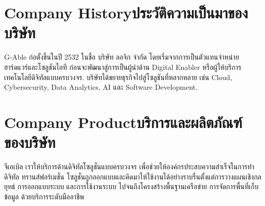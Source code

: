\section{\ifenglish Company History\else ประวัติความเป็นมาของบริษัท\fi}

G-Able ก่อตั้งขึ้นในปี 2532 ในชื่อ บริษัท ลอจิก จำกัด โดยเริ่มจากการเป็นตัวแทนจำหน่ายฮาร์ดแวร์และโซลูชันไอที ก่อนจะพัฒนาสู่การเป็นผู้นำด้าน Digital Enabler หรือผู้ให้บริการเทคโนโลยีดิจิทัลแบบครบวงจร. บริษัทได้ขยายธุรกิจไปสู่โซลูชันที่หลากหลาย เช่น Cloud, Cybersecurity, Data Analytics, AI และ Software Development. 

\section{\ifenglish Company Product\else บริการและผลิตภัณฑ์ของบริษัท\fi}
จีเอเบิล เราให้บริการด้านดิจิทัลโซลูชั่นแบบครบวงจร เพื่อช่วยให้องค์กรประสบความสำเร็จในการทำ ดิจิทัล ทรานส์ฟอร์เมชั่น
โซลูชั่นถูกออกแบบและคิดมาให้ใช้งานได้อย่างราบรื่นตั้งแต่การวางแผนเชิงกลยุทธ์ การออกแบบระบบ และการใช้งานระบบ ไปจนถึงโครงสร้างพื้นฐานเครือข่าย การจัดการพื้นที่เก็บข้อมูล ด้วยบริการระดับมืออาชีพ

